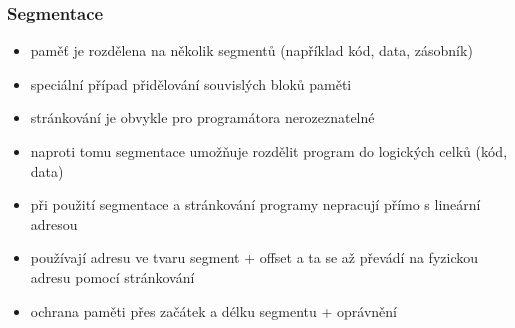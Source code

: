 \documentclass[10pt,a4paper]{article}
\begin{document}
\subsubsection{Segmentace}
\begin{itemize}
	\item paměť je rozdělena na několik segmentů (například kód, data, zásobník)
	\item speciální případ přidělování souvislých bloků paměti
	\item stránkování je obvykle pro programátora nerozeznatelné
	\item naproti tomu segmentace umožňuje rozdělit program do logických
celků (kód, data)
	\item při použití segmentace a stránkování programy nepracují přímo s
lineární adresou
	\item používají adresu ve tvaru segment + offset a ta se až převádí na
fyzickou adresu pomocí stránkování
	\item ochrana paměti přes začátek a délku segmentu + oprávnění
\end{itemize}
\end{document}
